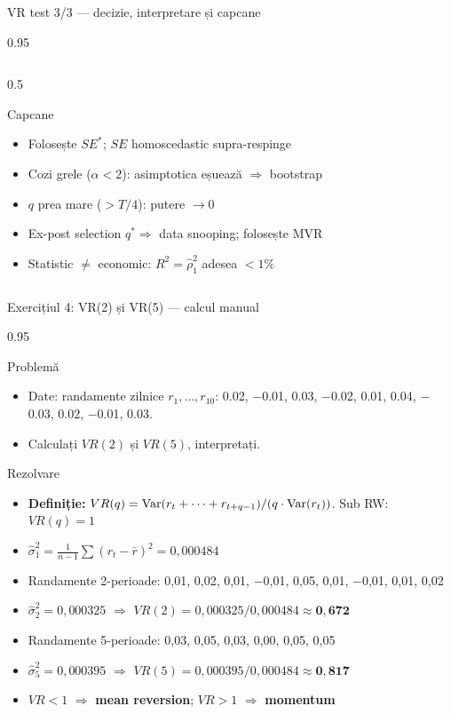 \documentclass[9pt, aspectratio=169, t]{beamer}
\begin{document}
\begin{frame}[shrink=10]{VR test 3/3 --- decizie, interpretare și capcane}
\begin{cminipage}{0.95\textwidth}
\begin{columns}[T]
\begin{column}{0.5\textwidth}
\begin{alertblock}{Capcane}
\begin{itemize}
    \item Folosește $SE^*$; $SE$ homoscedastic supra-respinge
    \item Cozi grele ($\alpha < 2$): asimptotica eșuează $\Rightarrow$ bootstrap
    \item $q$ prea mare ($> T/4$): putere $\to 0$
    \item Ex-post selection $q^* \Rightarrow$ data snooping; folosește MVR
    \item Statistic $\neq$ economic: $R^2 = \hat\rho_1^2$ adesea $< 1\%$
\end{itemize}
\end{alertblock}
\end{column}
\end{columns}
\end{cminipage}
\end{frame}

\begin{frame}[shrink=15]{Exercițiul 4: VR(2) și VR(5) --- calcul manual}
\begin{cminipage}{0.95\textwidth}
\begin{block}{Problemă}
\begin{itemize}\setlength{\itemsep}{0pt}
    \item Date: randamente zilnice $r_1, \ldots, r_{10}$: 0.02, $-$0.01, 0.03, $-$0.02, 0.01, 0.04, $-$0.03, 0.02, $-$0.01, 0.03.
    \item Calculați $VR(2)$ și $VR(5)$, interpretați.
\end{itemize}
\end{block}

\begin{exampleblock}{Rezolvare}
\small
\begin{itemize}\setlength{\itemsep}{0pt}
    \item \textbf{Definiție:} $VR(q) = \text{Var}(r_t + \cdots + r_{t+q-1}) / (q \cdot \text{Var}(r_t))$. Sub RW: $VR(q) = 1$
    \item $\hat\sigma^2_1 = \frac{1}{n-1}\sum(r_t - \bar{r})^2 = 0{,}000484$
    \item Randamente 2-perioade: 0{,}01, 0{,}02, 0{,}01, $-$0{,}01, 0{,}05, 0{,}01, $-$0{,}01, 0{,}01, 0{,}02
    \item $\hat\sigma^2_2 = 0{,}000325$ $\Rightarrow$ $VR(2) = 0{,}000325 / 0{,}000484 \approx \mathbf{0{,}672}$
    \item Randamente 5-perioade: 0{,}03, 0{,}05, 0{,}03, 0{,}00, 0{,}05, 0{,}05
    \item $\hat\sigma^2_5 = 0{,}000395$ $\Rightarrow$ $VR(5) = 0{,}000395 / 0{,}000484 \approx \mathbf{0{,}817}$
    \item $VR < 1$ $\Rightarrow$ \textbf{mean reversion}; $VR > 1$ $\Rightarrow$ \textbf{momentum}
\end{itemize}
\end{exampleblock}
\end{cminipage}
\end{frame}
\end{document}
